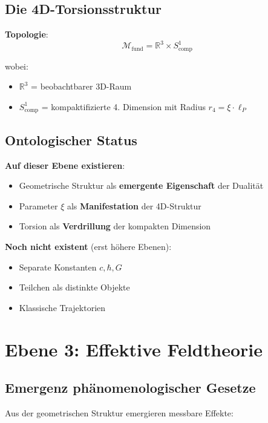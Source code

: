\subsection{Die 4D-Torsionsstruktur}

\textbf{Topologie}:
\begin{equation}
\mathcal{M}_{\text{fund}} = \mathbb{R}^3 \times S^1_{\text{comp}}
\end{equation}

wobei:
\begin{itemize}
\item $\mathbb{R}^3$ = beobachtbarer 3D-Raum
\item $S^1_{\text{comp}}$ = kompaktifizierte 4. Dimension mit Radius $r_4 = \xi \cdot \ell_P$
\end{itemize}

\subsection{Ontologischer Status}

\textbf{Auf dieser Ebene existieren}:
\begin{itemize}
\item Geometrische Struktur als \textbf{emergente Eigenschaft} der Dualität
\item Parameter $\xi$ als \textbf{Manifestation} der 4D-Struktur
\item Torsion als \textbf{Verdrillung} der kompakten Dimension
\end{itemize}

\textbf{Noch nicht existent} (erst höhere Ebenen):
\begin{itemize}
\item Separate Konstanten $c, \hbar, G$
\item Teilchen als distinkte Objekte
\item Klassische Trajektorien
\end{itemize}

\section{Ebene 3: Effektive Feldtheorie}

\subsection{Emergenz phänomenologischer Gesetze}

Aus der geometrischen Struktur emergieren messbare Effekte:

